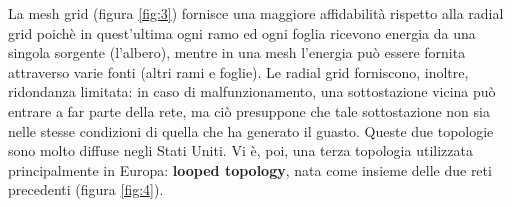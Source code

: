 \begin{figure}[h]
\end{figure}

La mesh grid (figura \ref{fig:3}) fornisce una maggiore affidabilità rispetto alla radial grid poichè in quest'ultima ogni ramo ed ogni foglia ricevono energia da una singola sorgente (l'albero), mentre in una mesh l'energia può essere fornita attraverso varie fonti (altri rami e foglie). \newline
Le radial grid forniscono, inoltre, ridondanza limitata: in caso di malfunzionamento, una sottostazione vicina può entrare a far parte della rete, ma ciò presuppone che tale sottostazione non sia nelle stesse condizioni di quella che ha generato il guasto. \newline
Queste due topologie sono molto diffuse negli Stati Uniti.
Vi è, poi, una terza topologia utilizzata principalmente in Europa: \textbf{looped topology}, nata come insieme delle due reti precedenti (figura \ref{fig:4}). 

